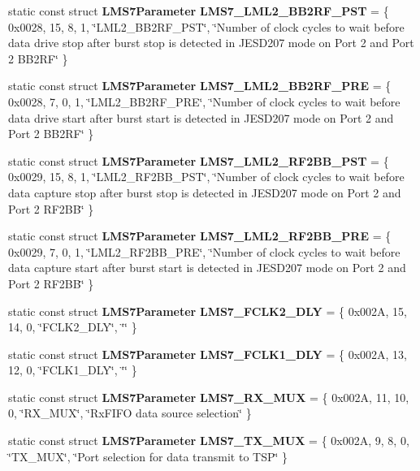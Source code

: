 \begin{DoxyCompactItemize}
\item 
static const struct {\bf L\+M\+S7\+Parameter} {\bf L\+M\+S7\+\_\+\+L\+M\+L2\+\_\+\+B\+B2\+R\+F\+\_\+\+P\+ST} = \{ 0x0028, 15, 8, 1, \char`\"{}\+L\+M\+L2\+\_\+\+B\+B2\+R\+F\+\_\+\+P\+S\+T\char`\"{}, \char`\"{}\+Number of clock cycles to wait before data drive stop after burst stop is detected in J\+E\+S\+D207 mode on Port 2 and Port 2 B\+B2\+R\+F\char`\"{} \}
\item 
static const struct {\bf L\+M\+S7\+Parameter} {\bf L\+M\+S7\+\_\+\+L\+M\+L2\+\_\+\+B\+B2\+R\+F\+\_\+\+P\+RE} = \{ 0x0028, 7, 0, 1, \char`\"{}\+L\+M\+L2\+\_\+\+B\+B2\+R\+F\+\_\+\+P\+R\+E\char`\"{}, \char`\"{}\+Number of clock cycles to wait before data drive start after burst start is detected in J\+E\+S\+D207 mode on Port 2 and Port 2 B\+B2\+R\+F\char`\"{} \}
\item 
static const struct {\bf L\+M\+S7\+Parameter} {\bf L\+M\+S7\+\_\+\+L\+M\+L2\+\_\+\+R\+F2\+B\+B\+\_\+\+P\+ST} = \{ 0x0029, 15, 8, 1, \char`\"{}\+L\+M\+L2\+\_\+\+R\+F2\+B\+B\+\_\+\+P\+S\+T\char`\"{}, \char`\"{}\+Number of clock cycles to wait before data capture stop after burst stop is detected in J\+E\+S\+D207 mode on Port 2 and Port 2 R\+F2\+B\+B\char`\"{} \}
\item 
static const struct {\bf L\+M\+S7\+Parameter} {\bf L\+M\+S7\+\_\+\+L\+M\+L2\+\_\+\+R\+F2\+B\+B\+\_\+\+P\+RE} = \{ 0x0029, 7, 0, 1, \char`\"{}\+L\+M\+L2\+\_\+\+R\+F2\+B\+B\+\_\+\+P\+R\+E\char`\"{}, \char`\"{}\+Number of clock cycles to wait before data capture start after burst start is detected in J\+E\+S\+D207 mode on Port 2 and Port 2 R\+F2\+B\+B\char`\"{} \}
\item 
static const struct {\bf L\+M\+S7\+Parameter} {\bf L\+M\+S7\+\_\+\+F\+C\+L\+K2\+\_\+\+D\+LY} = \{ 0x002\+A, 15, 14, 0, \char`\"{}\+F\+C\+L\+K2\+\_\+\+D\+L\+Y\char`\"{}, \char`\"{}\char`\"{} \}
\item 
static const struct {\bf L\+M\+S7\+Parameter} {\bf L\+M\+S7\+\_\+\+F\+C\+L\+K1\+\_\+\+D\+LY} = \{ 0x002\+A, 13, 12, 0, \char`\"{}\+F\+C\+L\+K1\+\_\+\+D\+L\+Y\char`\"{}, \char`\"{}\char`\"{} \}
\item 
static const struct {\bf L\+M\+S7\+Parameter} {\bf L\+M\+S7\+\_\+\+R\+X\+\_\+\+M\+UX} = \{ 0x002\+A, 11, 10, 0, \char`\"{}\+R\+X\+\_\+\+M\+U\+X\char`\"{}, \char`\"{}\+Rx\+F\+I\+F\+O data source selection\char`\"{} \}
\item 
static const struct {\bf L\+M\+S7\+Parameter} {\bf L\+M\+S7\+\_\+\+T\+X\+\_\+\+M\+UX} = \{ 0x002\+A, 9, 8, 0, \char`\"{}\+T\+X\+\_\+\+M\+U\+X\char`\"{}, \char`\"{}\+Port selection for data transmit to T\+S\+P\char`\"{} \}

\end{DoxyCompactItemize}
